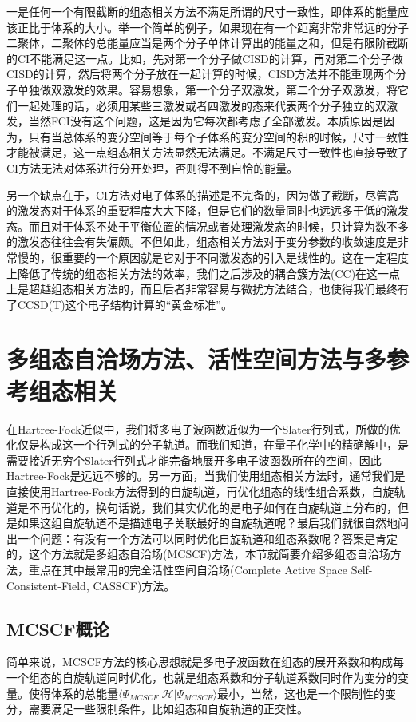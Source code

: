 \documentclass[12pt,a4paper,openany,twoside]{book}
\numberwithin{equation}{section}
\begin{document}
          一是任何一个有限截断的组态相关方法不满足所谓的尺寸一致性，即体系的能量应该正比于体系的大小。举一个简单的例子，如果现在有一个距离非常非常远的分子二聚体，二聚体的总能量应当是两个分子单体计算出的能量之和，但是有限阶截断的CI不能满足这一点。比如，先对第一个分子做CISD的计算，再对第二个分子做CISD的计算，然后将两个分子放在一起计算的时候，CISD方法并不能重现两个分子单独做双激发的效果。容易想象，第一个分子双激发，第二个分子双激发，将它们一起处理的话，必须用某些三激发或者四激发的态来代表两个分子独立的双激发，当然FCI没有这个问题，这是因为它每次都考虑了全部激发。本质原因是因为，只有当总体系的变分空间等于每个子体系的变分空间的积的时候，尺寸一致性才能被满足，这一点组态相关方法显然无法满足。不满足尺寸一致性也直接导致了CI方法无法对体系进行分开处理，否则得不到自恰的能量。

          另一个缺点在于，CI方法对电子体系的描述是不完备的，因为做了截断，尽管高的激发态对于体系的重要程度大大下降，但是它们的数量同时也远远多于低的激发态。而且对于体系不处于平衡位置的情况或者处理激发态的时候，只计算为数不多的激发态往往会有失偏颇。不但如此，组态相关方法对于变分参数的收敛速度是非常慢的，很重要的一个原因就是它对于不同激发态的引入是线性的。这在一定程度上降低了传统的组态相关方法的效率，我们之后涉及的耦合簇方法(CC)在这一点上是超越组态相关方法的，而且后者非常容易与微扰方法结合，也使得我们最终有了CCSD(T)这个电子结构计算的“黄金标准”。

      \section{多组态自洽场方法、活性空间方法与多参考组态相关}
        在Hartree-Fock近似中，我们将多电子波函数近似为一个Slater行列式，所做的优化仅是构成这一个行列式的分子轨道。而我们知道，在量子化学中的精确解中，是需要接近无穷个Slater行列式才能完备地展开多电子波函数所在的空间，因此Hartree-Fock是远远不够的。另一方面，当我们使用组态相关方法时，通常我们是直接使用Hartree-Fock方法得到的自旋轨道，再优化组态的线性组合系数，自旋轨道是不再优化的，换句话说，我们其实优化的是电子如何在自旋轨道上分布的，但是如果这组自旋轨道不是描述电子关联最好的自旋轨道呢？最后我们就很自然地问出一个问题：有没有一个方法可以同时优化自旋轨道和组态系数呢？答案是肯定的，这个方法就是多组态自洽场(MCSCF)方法，本节就简要介绍多组态自洽场方法，重点在其中最常用的完全活性空间自洽场(Complete Active Space Self-Consistent-Field, CASSCF)方法。
        \subsection{MCSCF概论}
          简单来说，MCSCF方法的核心思想就是多电子波函数在组态的展开系数和构成每一个组态的自旋轨道同时优化，也就是组态系数和分子轨道系数同时作为变分的变量。使得体系的总能量$\langle \Psi_{MCSCF} |\mathscr{H}|\Psi_{MCSCF}\rangle$最小，当然，这也是一个限制性的变分，需要满足一些限制条件，比如组态和自旋轨道的正交性。
\end{document}
